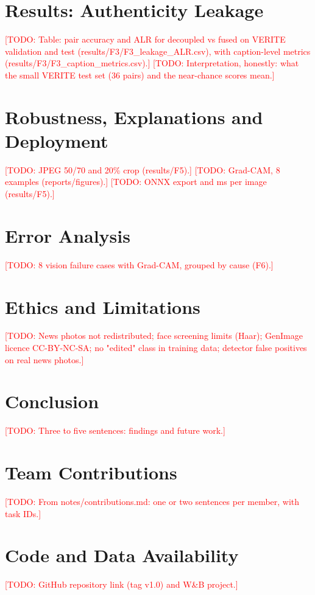 \documentclass[11pt,a4paper]{article}
\newcommand{\todo}[1]{\textcolor{red}{[TODO: #1]}}
\begin{document}
\section{Results: Authenticity Leakage}
\label{sec:leakage}
\todo{Table: pair accuracy and ALR for decoupled vs fused on VERITE validation and test
(results/F3/F3\_leakage\_ALR.csv), with caption-level metrics
(results/F3/F3\_caption\_metrics.csv).}
\todo{Interpretation, honestly: what the small VERITE test set (36 pairs) and the near-chance
scores mean.}

\section{Robustness, Explanations and Deployment}
\label{sec:robustness}
\todo{JPEG 50/70 and 20\% crop (results/F5).}
\todo{Grad-CAM, 8 examples (reports/figures).}
\todo{ONNX export and ms per image (results/F5).}

\section{Error Analysis}
\label{sec:errors}
\todo{8 vision failure cases with Grad-CAM, grouped by cause (F6).}

\section{Ethics and Limitations}
\label{sec:ethics}
\todo{News photos not redistributed; face screening limits (Haar); GenImage licence
CC-BY-NC-SA; no "edited" class in training data; detector false positives on real news photos.}

\section{Conclusion}
\label{sec:conclusion}
\todo{Three to five sentences: findings and future work.}

\section*{Team Contributions}
\todo{From notes/contributions.md: one or two sentences per member, with task IDs.}

\section*{Code and Data Availability}
\todo{GitHub repository link (tag v1.0) and W\&B project.}



\end{document}
